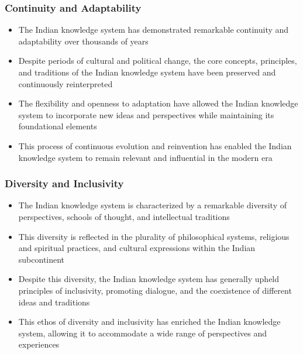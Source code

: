 \begin{frame}[fragile]\frametitle{Continuity and Adaptability}
    \begin{itemize}
        \item The Indian knowledge system has demonstrated remarkable continuity and adaptability over thousands of years
        \item Despite periods of cultural and political change, the core concepts, principles, and traditions of the Indian knowledge system have been preserved and continuously reinterpreted
        \item The flexibility and openness to adaptation have allowed the Indian knowledge system to incorporate new ideas and perspectives while maintaining its foundational elements
        \item This process of continuous evolution and reinvention has enabled the Indian knowledge system to remain relevant and influential in the modern era
    \end{itemize}
\end{frame}

\begin{frame}[fragile]\frametitle{Diversity and Inclusivity}
    \begin{itemize}
        \item The Indian knowledge system is characterized by a remarkable diversity of perspectives, schools of thought, and intellectual traditions
        \item This diversity is reflected in the plurality of philosophical systems, religious and spiritual practices, and cultural expressions within the Indian subcontinent
        \item Despite this diversity, the Indian knowledge system has generally upheld principles of inclusivity, promoting dialogue, and the coexistence of different ideas and traditions
        \item This ethos of diversity and inclusivity has enriched the Indian knowledge system, allowing it to accommodate a wide range of perspectives and experiences
    \end{itemize}
\end{frame}

